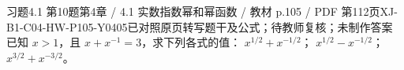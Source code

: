 \par\noindent\begin{minipage}{\linewidth}
\begin{bankitem}{习题4.1 第10题}{第4章 / 4.1 实数指数幂和幂函数 / 教材 p.105 / PDF 第112页}{XJ-B1-C04-HW-P105-Y0405}{已对照原页转写题干及公式；待教师复核；未制作答案}
已知 $x>1$，且 $x+x^{-1}=3$，求下列各式的值：
$x^{1/2}+x^{-1/2}$；
$x^{1/2}-x^{-1/2}$；
$x^{3/2}+x^{-3/2}$。
\end{bankitem}
\end{minipage}\par\medskip
